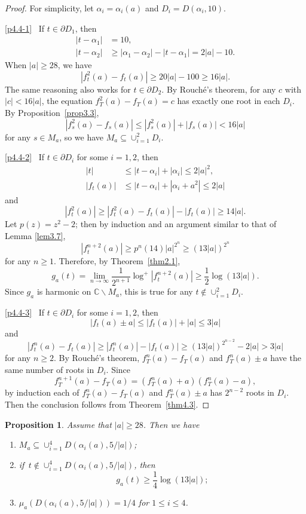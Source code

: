 \documentclass[10pt,a4paper]{amsart}
\numberwithin{equation}{section}
\theoremstyle{plain}
\newtheorem{prop}[thm]{Proposition}
\theoremstyle{definition}
\theoremstyle{remark}
\newcommand{\C}{\mathbb C}
\begin{document}
\begin{proof}
  For simplicity, let $\alpha_{i}=\alpha_{i}(a)$ and $D_{i}=D(\alpha_{i},10)$.

\eqref{p4.4-1}~ If $t\in\partial D_{1}$, then
\begin{align*}
|t-\alpha_{1}| & =10,\\
|t-\alpha_{2}| & \geq|\alpha_{1}-\alpha_{2}|-|t-\alpha_{1}|=2|a|-10.
\end{align*}
When $|a|\geq28$, we have
\[
|f_{t}^{2}(a)-f_{t}(a)|\geq20|a|-100\geq16|a|.
\]
The same reasoning also works for $t\in\partial D_{2}$. By Rouch\'e's
theorem, for any $c$ with $|c|<16|a|$, the equation $f_{T}^{2}(a)-f_{T}(a)=c$
has exactly one root in each $D_{i}$. By Proposition~\ref{prop3.3},
\[
\left|f_{s}^{2}(a)-f_{s}(a)\right|\leq\left|f_{s}^{2}(a)\right|+|f_{s}(a)|<16|a|
\]
for any $s\in M_{a}$, so we have $M_{a}\subseteq\cup_{i=1}^{2}D_{i}$.

\eqref{p4.4-2}~ If $t\in\partial D_{i}$ for some $i=1,2$, then
\begin{align*}
|t| & \leq|t-\alpha_{i}|+|\alpha_{i}|\leq2|a|^{2},\\
|f_{t}(a)| & \leq|t-\alpha_{i}|+|\alpha_{i}+a^{2}|\leq2|a|
\end{align*}
and
\[
\left|f_{t}^{2}(a)\right|\geq\left|f_{t}^{2}(a)-f_{t}(a)\right|-|f_{t}(a)|\geq14|a|.
\]
Let $p(z)=z^{2}-2$; then by induction and an argument similar to that of Lemma
\ref{lem3.7},
\[
\left|f_{t}^{n+2}(a)\right|\geq p^{n}(14)|a|^{2^{n}}\geq(13|a|)^{2^{n}}
\]
for any $n\geq1$. Therefore, by Theorem~\ref{thm2.1},
\[
g_{a}(t)=\lim_{n\to\infty}\frac{1}{2^{n+1}}\log^{+}\left|f_{t}^{n+2}(a)\right|\geq\frac{1}{2}\log(13|a|).
\]
Since $g_{a}$ is harmonic on $\C\backslash M_{a}$, this
is true for any $t\notin\cup_{i=1}^{2}D_{i}$.

\eqref{p4.4-3}~  If $t\in\partial D_{i}$ for some $i=1,2$, then
\[
|f_{t}(a)\pm a|\leq|f_{t}(a)|+|a|\leq3|a|
\]
and
\[
\left|f_{t}^{n}(a)-f_{t}(a)\right|\geq\left|f_{t}^{n}(a)\right|-|f_{t}(a)|\geq(13|a|)^{2^{n-2}}-2|a|>3|a|
\]
for any $n\geq2$. By Rouch\'e's theorem, $f_{T}^{n}(a)-f_{T}(a)$
and $f_{T}^{n}(a)\pm a$ have the same number of roots in $D_{i}$.
Since
\[
f_{T}^{n+1}(a)-f_{T}(a)=\left(f_{T}^{n}(a)+a\right)\left(f_{T}^{n}(a)-a\right),
\]
by induction each of $f_{T}^{n}(a)-f_{T}(a)$ and $f_{T}^{n}(a)\pm a$
has $2^{n-2}$ roots in $D_{i}$. Then the conclusion follows from
Theorem~\ref{thm4.3}.
\end{proof}

\begin{prop}\label{prop4.5}
Assume that $|a|\geq28$. Then we have
\begin{enumerate}
\item $M_{a}\subseteq\cup_{i=1}^{4}D(\alpha_{i}(a),5/|a|)$;
\item if\, $t\notin\cup_{i=1}^{4}D(\alpha_{i}(a),5/|a|)$, then
\[
g_{a}(t)\geq\frac{1}{4}\log(13|a|); 
\]
\item $\mu_{a}(D(\alpha_{i}(a),5/|a|))=1/4$ for $1\leq i\leq4$.
\end{enumerate}
\end{prop}
\end{document}
